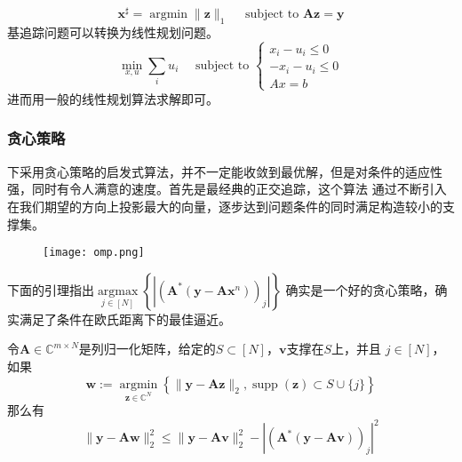 \begin{equation}
    \mathbf{x}^{\sharp}=\operatorname{argmin}\|\mathbf{z}\|_1 \quad \text { subject to } \mathbf{A z}=\mathbf{y}
\end{equation}
基追踪问题可以转换为线性规划问题。
\begin{equation}
    \min _{x,u} \sum_i u_i \quad \text { subject to } \begin{cases}
    x_i-u_i  \leq 0 \\
    -x_i-u_i  \leq 0\\
    A x  =b
    \end{cases}
\end{equation}
进而用一般的线性规划算法求解即可。\par
\subsubsection{贪心策略}
下采用贪心策略的启发式算法，并不一定能收敛到最优解，但是对条件的适应性强，同时有令人满意的速度。首先是最经典的正交追踪，这个算法
通过不断引入在我们期望的方向上投影最大的向量，逐步达到问题条件的同时满足构造较小的支撑集。\par
\begin{figure}[!htbp]
    \centering
    \texttt{[image: omp.png]}
\end{figure}
下面的引理指出$\underset{j \in[N]}{\operatorname{argmax}}\left\{\left|\left(\mathbf{A}^*\left(\mathbf{y}-\mathbf{A} \mathbf{x}^n\right)\right)_j\right|\right\}$
确实是一个好的贪心策略，确实满足了条件在欧氏距离下的最佳逼近。
\begin{lemma}
    令$\mathbf{A} \in \mathbb{C}^{m \times N}$是列归一化矩阵，给定的$S \subset[N]$，$\mathbf{v}$支撑在$S$上，并且
    $j \in[N]$，如果
    \begin{equation}
        \mathbf{w}:=\underset{\mathbf{z} \in \mathbb{C}^N}{\operatorname{argmin}}\left\{\|\mathbf{y}-\mathbf{A z}\|_2,\operatorname{supp}(\mathbf{z}) \subset S \cup\{j\}\right\}
    \end{equation}
    那么有
    \begin{equation}
        \|\mathbf{y}-\mathbf{A} \mathbf{w}\|_2^2 \leq\|\mathbf{y}-\mathbf{A v}\|_2^2-\left|\left(\mathbf{A}^*(\mathbf{y}-\mathbf{A} \mathbf{v})\right)_j\right|^2
    \end{equation}
\end{lemma}
